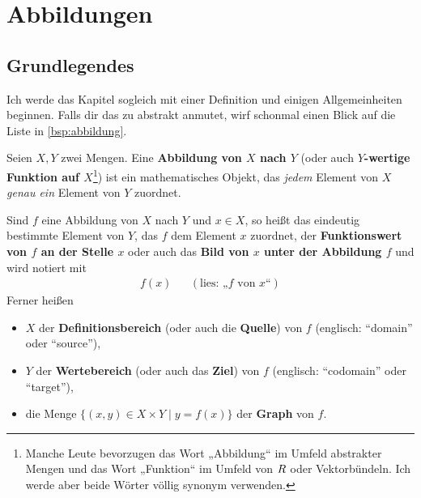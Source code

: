 



\chapter{Abbildungen} \label{chap:abbildungen}


\section{Grundlegendes}


Ich werde das Kapitel sogleich mit einer Definition und einigen Allgemeinheiten beginnen. Falls dir das zu abstrakt anmutet, wirf schonmal einen Blick auf die Liste in \cref{bsp:abbildung}.


\begin{defin}[Abbildung] \label{def:abbildung}     
    Seien $X,Y$ zwei Mengen. Eine \textbf{Abbildung von $X$ nach $Y$} (oder auch \textbf{$Y$-wertige Funktion auf $X$}\footnote{Manche Leute bevorzugen das Wort „Abbildung“ im Umfeld abstrakter Mengen und das Wort „Funktion“ im Umfeld von $\relax R$ oder Vektorbündeln. Ich werde aber beide Wörter völlig synonym verwenden.}) ist ein mathematisches Objekt, das \emph{jedem} Element von $X$ \emph{genau ein} Element von $Y$ zuordnet.

    Sind $f$ eine Abbildung von $X$ nach $Y$ und $x\in X$, so heißt das eindeutig bestimmte Element von $Y$, das $f$ dem Element $x$ zuordnet, der \textbf{Funktionswert von $f$ an der Stelle $x$} oder auch das \textbf{Bild von $x$ unter der Abbildung $f$} und wird notiert mit
    \begin{align*}
        f(x) && (\text{lies: „$f$ von $x$“})
    \end{align*}
    Ferner heißen
    \begin{itemize}
        \item $X$ der \textbf{Definitionsbereich} (oder auch die \textbf{Quelle}) von $f$ (englisch: ``domain'' oder ``source''),
        \item $Y$ der \textbf{Wertebereich} (oder auch das \textbf{Ziel}) von $f$ (englisch: ``codomain'' oder ``target''),
        \item die Menge $\{(x,y)\in X\times Y\mid y=f(x)\}$ der \textbf{Graph} von $f$.
    \end{itemize}
\end{defin}


